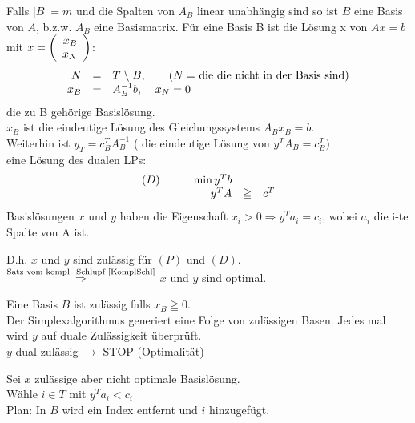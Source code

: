 Falls $|B| = m$ und die Spalten von $A_{B}$ linear unabhängig sind so ist
$B$ eine Basis von $A$, b.z.w. $A_{B}$ eine Basismatrix. Für eine Basis B
ist die Lösung x von $A x=b$ mit $ x=\left(\begin{array}{r} x_{B}\\x_{N} \end{array}\right)$:
\[\begin{array}{rcl}
N&=& T \;\backslash\; B, \hspace{7mm} \mbox{($N =$ die die nicht in der 
Basis sind)}\\
x_{B} &=& A_{B}^{-1} b, \; \; \;\; x_{N} =0
\end{array}\]
die zu B gehörige Basislösung.\\
$x_{B}$ ist die eindeutige Lösung des Gleichungssystems $A_{B} x_{B} = b$.\\
Weiterhin ist $y_{T}=c_{B}^{T}A_{B}^{-1}$ ( die eindeutige Lösung von 
$y^{T}A_{B} = c_{B}^{T})$\\
eine Lösung des dualen LPs:
\[\begin{array}{rcl}
(D) \hspace{10mm} \min y^{T} b\\
y^{T}A&\geqq&c^{T}\\
\end{array}\]
Basislösungen $x$ und $y$ haben die Eigenschaft $x_{i} > 0 \Rightarrow
y^{T}a_{i} = c_{i}$, wobei $a_{i}$ die i-te Spalte von A ist.

D.h. $x$ und $y$ sind zulässig für $(P)$ und $(D)$.\\
$\stackrel{\mbox{\scriptsize Satz vom kompl. Schlupf \ref{KomplSchl}}}{\Rightarrow}$
$x$ und $y$ sind optimal.

Eine Basis $B$ ist zulässig falls $x_{B} \geqq 0$.\\
Der Simplexalgorithmus generiert eine Folge von zulässigen Basen. Jedes mal
wird $y$ auf duale Zulässigkeit überprüft.\\
$y$ dual zulässig $\rightarrow$ STOP (Optimalität)

Sei $x$ zulässige aber nicht optimale Basislösung.\\
Wähle $i\in T$ mit $y^{T}a_{i} < c_{i}$\\
Plan: In $B$ wird ein Index entfernt und $i$ hinzugefügt.

